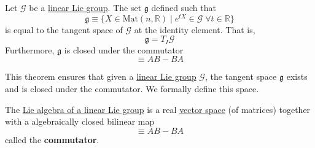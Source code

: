   \begin{theorem}
    \label{thm:lie-algebra-of-a-linear-lie-group}
    Let $\mathcal{G}$ be a \hyperref[def:linear-lie-group]{linear Lie group}. The set $\mathfrak{g}$ defined such that
    \begin{equation}
      \mathfrak{g} \equiv \{X \in \text{Mat}(n, \mathbb{R}) \; | \; e^{t X} \in \mathcal{G} \; \forall t \in \mathbb{R}\}
    \end{equation}
    is equal to the tangent space of $\mathcal{G}$ at the identity element. That is, 
    \begin{equation}
      \mathfrak{g} = T_I \mathcal{G}
    \end{equation}
    Furthermore, $\mathfrak{g}$ is closed under the commutator 
    \begin{equation}
      [A,B] \equiv A B - B A
    \end{equation}
  \end{theorem}

  This theorem ensures that given a \hyperref[def:linear-lie-group]{linear Lie group} $\mathcal{G}$, the tangent space $\mathfrak{g}$ exists and is closed under the commutator. We formally define this space. 

  \begin{definition}
    \label{def:lie-bracket-as-the-commutator}
    The \hyperref[thm:lie-algebra-of-a-linear-lie-group]{Lie algebra of a linear Lie group} is a real \hyperref[def:vector-space]{vector space} (of matrices) together with a algebraically closed bilinear map 
    \begin{equation}
      [A,B] \equiv A B - B A
    \end{equation}
    called the \textbf{commutator}. 
  \end{definition} 

